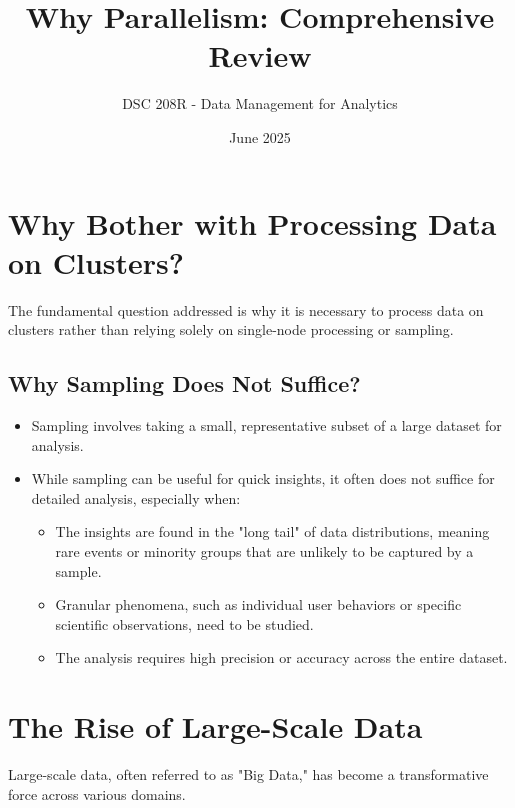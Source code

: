 \documentclass{article}
\title{Why Parallelism: Comprehensive Review}
\author{DSC 208R - Data Management for Analytics}
\date{June 2025}
\begin{document}
\maketitle

\section*{Why Bother with Processing Data on Clusters?}
The fundamental question addressed is why it is necessary to process data on clusters rather than relying solely on single-node processing or sampling.

\subsection*{Why Sampling Does Not Suffice?}
\begin{itemize}
    \item Sampling involves taking a small, representative subset of a large dataset for analysis.
    \item While sampling can be useful for quick insights, it often does not suffice for detailed analysis, especially when:
        \begin{itemize}
            \item The insights are found in the "long tail" of data distributions, meaning rare events or minority groups that are unlikely to be captured by a sample.
            \item Granular phenomena, such as individual user behaviors or specific scientific observations, need to be studied.
            \item The analysis requires high precision or accuracy across the entire dataset.
        \end{itemize}
\end{itemize}

\section*{The Rise of Large-Scale Data}
Large-scale data, often referred to as "Big Data," has become a transformative force across various domains.
\end{document}
